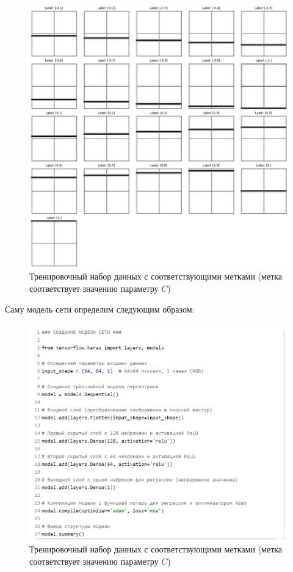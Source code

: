 \documentclass[12pt, a4paper]{article}
\begin{document}
	
	\begin{figure}[!h]
		\centering
		\includegraphics[width=1\linewidth]{output}
		\caption{Тренировочный набор данных с соответствующими метками (метка соответствует значению параметру $C$)}
		\label{images}
	\end{figure} 
	\newpage
	
	Саму модель сети определим следующим образом:
	\begin{figure}[!h]
		\centering
		\includegraphics[width=1\linewidth]{model.jpg}
		\caption{Тренировочный набор данных с соответствующими метками (метка соответствует значению параметру $C$)}
		\label{model}
	\end{figure} 
	
\end{document}
